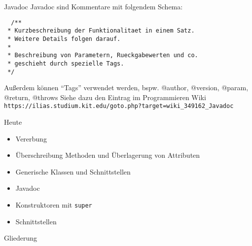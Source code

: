 \documentclass[18pt]{beamer}
\begin{document}
\begin{frame}[fragile]{Javadoc}
 Javadoc sind Kommentare mit folgendem Schema:
 \begin{lstlisting}
  /**
 * Kurzbeschreibung der Funktionalitaet in einem Satz.
 * Weitere Details folgen darauf.
 * 
 * Beschreibung von Parametern, Rueckgabewerten und co.
 * geschieht durch spezielle Tags.
 */
 \end{lstlisting}
Außerdem können ``Tags'' verwendet werden, bspw. @author, @version, @param, @return, @throws
Siehe dazu den Eintrag im Programmieren Wiki
\scriptsize
\verb|https://ilias.studium.kit.edu/goto.php?target=wiki_349162_Javadoc|
\end{frame}

\begin{frame}[fragile]{Heute}
\begin{itemize}
 \item Vererbung \checkmark
 \item Überschreibung Methoden und Überlagerung von Attributen \checkmark
 \item Generische Klassen und Schnittstellen \checkmark
 \item Javadoc \checkmark
 \item Konstruktoren mit \verb|super| \checkmark
 \item Schnittstellen \checkmark
\end{itemize}
\end{frame}


\begin{frame}
\titlepage
\end{frame}

\begin{frame}{Gliederung}
\tableofcontents
\end{frame}
\end{document}
